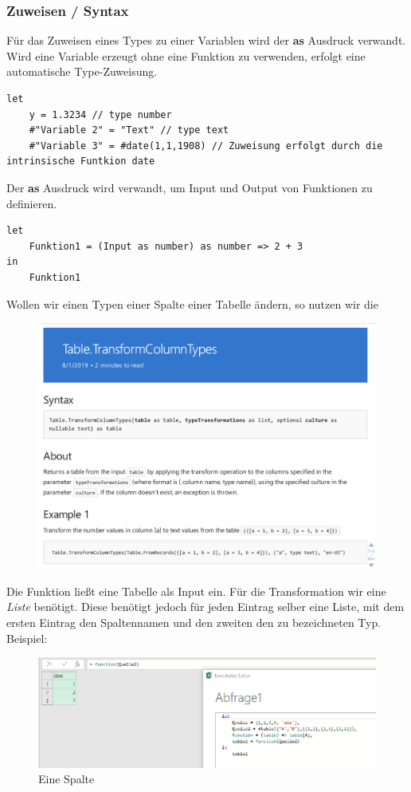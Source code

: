 \subsubsection{Zuweisen / Syntax}
Für das Zuweisen eines Types zu einer Variablen wird der \textbf{as} Ausdruck verwandt. Wird eine Variable erzeugt ohne eine Funktion zu verwenden, erfolgt eine automatische Type-Zuweisung.
\begin{lstlisting}[style=M]
let 
	y = 1.3234 // type number
	#"Variable 2" = "Text" // type text
	#"Variable 3" = #date(1,1,1908) // Zuweisung erfolgt durch die intrinsische Funtkion date
\end{lstlisting}
Der \textbf{as} Ausdruck wird verwandt, um Input und Output von Funktionen zu definieren. 
 \begin{lstlisting}[style=M]
let
	Funktion1 = (Input as number) as number => 2 + 3
in
	Funktion1
\end{lstlisting}
Wollen wir einen Typen einer Spalte einer Tabelle ändern, so nutzen wir die

\begin{figure}[H]
	\centering
	\includegraphics[scale = 0.3]{attachment/chapter_1/screenshot033}
	\caption{}
	\label{fig:screenshot033}
\end{figure}
Die Funktion ließt eine Tabelle als Input ein. Für die Transformation wir eine \textit{Liste} benötigt. Diese benötigt jedoch für jeden Eintrag selber eine Liste, mit dem ersten Eintrag den Spaltennamen und den zweiten den zu bezeichneten Typ.
Beispiel:
\begin{figure}[H]
	\centering
	\includegraphics[scale = 0.3]{attachment/chapter_1/screenshot032}
	\caption{Eine Spalte}
	\label{fig:screenshot032}
\end{figure}

